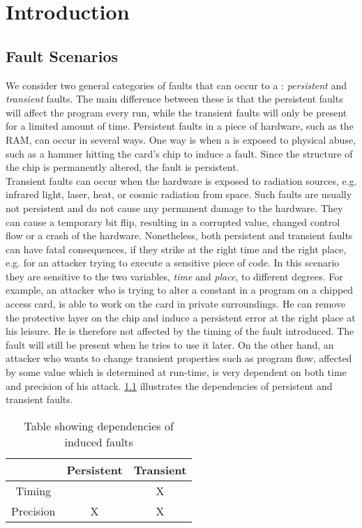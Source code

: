 \chapter{Introduction}
\section{Fault Scenarios}
We consider two general categories of faults that can occur to a \jc: \textit{persistent} and \textit{transient} faults. The main difference between these is that the persistent faults will affect the program every run, while the transient faults will only be present for a limited amount of time.
Persistent faults in a piece of hardware, such as the RAM, can occur in several ways. One way is when a \jc is exposed to physical abuse, such as a hammer hitting the card's chip to induce a fault. Since the structure of the chip is permanently altered, the fault is persistent.\\


Transient faults can occur when the hardware is exposed to radiation sources, e.g. infrared light, laser, heat, or cosmic radiation from space. Such faults are usually not persistent and do not cause any permanent damage to the hardware. They can cause a temporary bit flip, resulting in a corrupted value, changed control flow or a crash of the hardware.
Nonetheless, both persistent and transient faults can have fatal consequences, if they strike at the right time and the right place, e.g. for an attacker trying to execute a sensitive piece of code. In this scenario they are sensitive to the two variables, \textit{time} and \textit{place}, to different degrees. For example, an attacker who is trying to alter a constant in a program on a chipped access card, is able to work on the card in private surroundings. He can remove the protective layer on the chip and induce a persistent error at the right place at his leisure. He is therefore not affected by the timing of the fault introduced. The fault will still be present when he tries to use it later. On the other hand, an attacker who wants to change transient properties such as program flow, affected by some value which is determined at run-time, is very dependent on both time and precision of his attack. \cref{tab:dependencies} illustrates the dependencies of persistent and transient faults.

\begin{table}[h!]
\centering
\begin{tabular}{|c|c|c|}
\hline  & Persistent & Transient \\ 
\hline Timing &  & X \\ 
\hline Precision & X & X \\ 
\hline 
\end{tabular} 
\caption{Table showing dependencies of induced faults}
\label{tab:dependencies}
\end{table}

